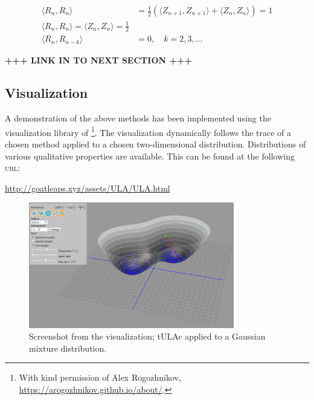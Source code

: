 \begin{align*}
    \langle R_n,R_n\rangle  &= \frac{1}{2} \left( \langle Z_{n+1},Z_{n+1}\rangle +\langle Z_{n},Z_{n}\rangle\right) =1\\
    \langle R_n,R_n\rangle = \langle Z_n,Z_n\rangle = \frac{1}{2}\\
    \langle R_n,R_{n-k} \rangle &= 0,   \quad k=2,3,\dots 
\end{align*}

{\bf +++ LINK IN TO NEXT SECTION +++ }

\subsection{Visualization}
A demonstration of the above methods has been implemented using the visualization library of \cite{rogozhnikov2016hmc}\footnote{With kind permission of Alex Rogozhnikov, \url{https://arogozhnikov.github.io/about/}.}. The visualization dynamically follows the trace of a chosen method applied to a chosen two-dimensional distribution. Distributions of various qualitative properties are available. This can be found at the following \textsc{url}: \\
   \centerline{ \url{http://goatleaps.xyz/assets/ULA/ULA.html}}

\begin{figure}[H]
\centering
  \begin{minipage}[b]{0.8\textwidth}
  \centering
    \includegraphics[width=0.8\textwidth]{Figures/ulavis.PNG}
    \caption{Screenshot from the visualization;  tULAc applied to a Gaussian mixture distribution.}
  \end{minipage}
\end{figure}